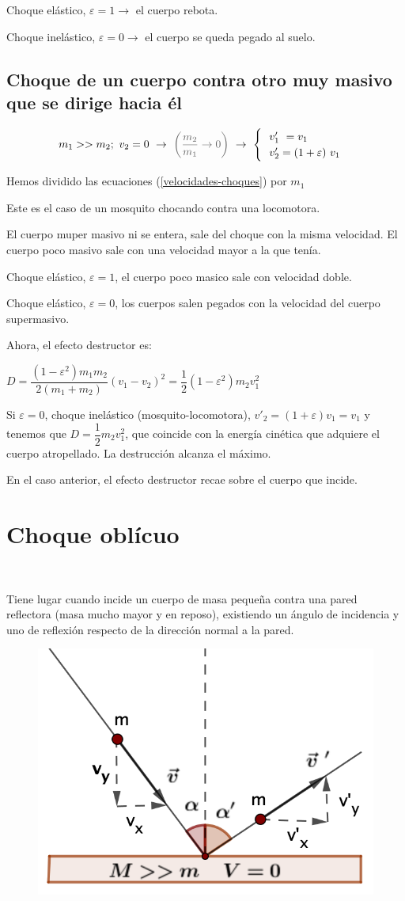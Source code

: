 Choque elástico, $\varepsilon=1 \to $ el cuerpo rebota.

Choque inelástico, $\varepsilon=0 \to $ el cuerpo se queda pegado al suelo.

\subsection{Choque de un cuerpo contra otro muy masivo que se dirige hacia él}


$$m_1>>m_2;\ v_2=0\ \to \ \textcolor{gris}{\left( \dfrac{m_2}{m_1}\to 0 \right)} \ \to \ \begin{cases}
 \ \ v'_1\ = v_1 \\ \ \  v'_2=(1+\varepsilon)\ v_1	
\end{cases}$$

\textcolor{gris}{ Hemos dividido las ecuaciones (\ref{velocidades-choques}) por $m_1$}

Este es el caso de un mosquito chocando contra una locomotora.

El cuerpo muper masivo ni se entera, sale del choque con la misma velocidad. El cuerpo poco masivo sale con una velocidad mayor a la que tenía.

Choque elástico, $\varepsilon=1$, el cuerpo poco masico sale con velocidad doble.

Choque elástico, $\varepsilon=0$, los cuerpos salen pegados con la velocidad del cuerpo supermasivo.

Ahora, el efecto destructor es:

$D=\dfrac{(1-\varepsilon^2)m_1m_2}{2(m_1+m_2)} (v_1-v_2)^2=\dfrac 1 2 (1-\varepsilon^2)m_2v_1^2$ 

Si $\varepsilon=0$, choque inelástico (mosquito-locomotora), $v'_2=(1+\varepsilon)v_1=v_1$ y tenemos que $D=\dfrac 1 2 m_2 v_1^2$,  que coincide con la energía cinética que adquiere el cuerpo atropellado. La destrucción alcanza el máximo.

En el caso anterior, el efecto destructor recae sobre el cuerpo que incide.

\section{Choque oblícuo}

\begin{multicols}{2}
$\quad$

Tiene lugar cuando incide un cuerpo de masa pequeña contra una pared reflectora (masa mucho mayor y en reposo), existiendo un ángulo de incidencia y uno de reflexión respecto de la dirección normal a la pared. 
\begin{figure}[H]
	\centering
	\includegraphics[width=.35\textwidth]{imagenes/imagenes17/T17IM06.png}
	\end{figure}
\end{multicols}

